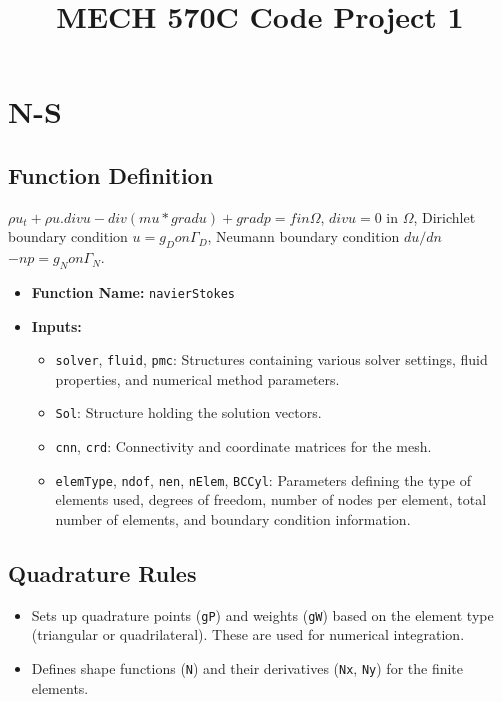 \documentclass[a4paper,12pt]{article} %
\begin{document}
\title{MECH 570C Code Project 1}
\maketitle

\section{N-S}
\subsection*{Function Definition}

$\rho u_t + \rho u.div u - div(mu*grad u) + grad p = f in \Omega$,    
$div u = 0$  in $\Omega$,                           
Dirichlet boundary condition        $u = g_D  on \Gamma_D$,         
Neumann boundary condition $du/dn$ $- np = g_N  on \Gamma_N$. 

\begin{itemize}
    \item \textbf{Function Name:} \texttt{navierStokes}
    \item \textbf{Inputs:} 
    \begin{itemize}
        \item \texttt{solver}, \texttt{fluid}, \texttt{pmc}: Structures containing various solver settings, fluid properties, and numerical method parameters.
        \item \texttt{Sol}: Structure holding the solution vectors.
        \item \texttt{cnn}, \texttt{crd}: Connectivity and coordinate matrices for the mesh.
        \item \texttt{elemType}, \texttt{ndof}, \texttt{nen}, \texttt{nElem}, \texttt{BCCyl}: Parameters defining the type of elements used, degrees of freedom, number of nodes per element, total number of elements, and boundary condition information.
    \end{itemize}
\end{itemize}

\subsection*{Quadrature Rules}
\begin{itemize}
    \item Sets up quadrature points (\texttt{gP}) and weights (\texttt{gW}) based on the element type (triangular or quadrilateral). These are used for numerical integration.
    \item Defines shape functions (\texttt{N}) and their derivatives (\texttt{Nx}, \texttt{Ny}) for the finite elements.
\end{itemize}
\end{document}
